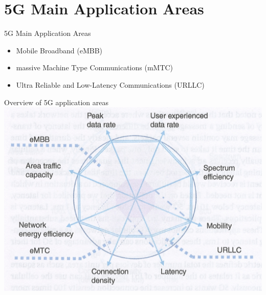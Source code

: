 \documentclass{beamer}
\begin{document}


\section[5G Main Application Areas]{5G Main Application Areas}

\begin{frame}{5G Main Application Areas}
  \vspace*{1.6em}
  \begin{itemize}
    \item Mobile Broadband (eMBB)
    \vspace*{0.75em}
    \item massive Machine Type Communications (mMTC)
    \vspace*{0.75em}
    \item Ultra Reliable and Low-Latency Communications (URLLC)
  \end{itemize}
\end{frame}

\begin{frame}{Overview of 5G application areas}
  \hspace*{0.6em}
  \includegraphics[scale=0.45]{beamer/fig/5g_application_areas.png}
\end{frame}
\end{document}

